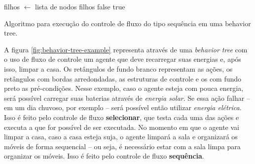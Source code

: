 \begin{algorithm}[H]
\begin{center}
	\begin{algorithmic}[1]
        \STATE filhos $\gets$ lista de nodos filhos
                \RETURN false
            \ENDIF
        \ENDFOR
        \RETURN true
    \end{algorithmic}
\end{center}
\caption[Algoritmo para execução do controle de fluxo do tipo sequência em uma
behavior tree.]
{\label{alg:behavior-tree-sequence} Algoritmo para execução do controle de fluxo
do tipo sequência em uma behavior tree.}
\end{algorithm}

A figura \ref{fig:behavior-tree-example} representa através de uma
\textit{behavior tree} com o uso de fluxo de controle um agente que deve
recarregar suas energias e, após isso, limpar a casa. Os retângulos de fundo
branco representam as ações, os retângulos com bordas arredondadas, as
estruturas de controle e os com fundo preto as pré-condições. Nesse exemplo,
caso o agente esteja com pouca energia, será possível carregar suas baterias
através de \textit{energia solar}. Se essa ação falhar -- em um dia chuvoso, por
exemplo -- será possível então utilizar \textit{energia elétrica}. Isso é feito
pelo controle de fluxo \textbf{selecionar}, que testa cada uma das ações e
executa a que for possível de ser executada.  No momento em que o agente vai
limpar a casa, caso a casa esteja suja, o agente limpará a sala e organizará os
móveis de forma sequencial -- ou seja, é necessário estar com a sala limpa para
organizar os móveis. Isso é feito pelo controle de fluxo \textbf{sequência}.

